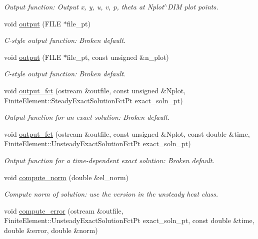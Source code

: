 \begin{DoxyCompactItemize}
\begin{DoxyCompactList}\small\item\em Output function\+: Output x, y, u, v, p, theta at Nplot$^\wedge$\+D\+IM plot points. \end{DoxyCompactList}\item 
void \hyperlink{classQThermalPVDElement_af290922dfcefef30dc03fca2a2cb4fbf}{output} (F\+I\+LE $\ast$file\+\_\+pt)
\begin{DoxyCompactList}\small\item\em C-\/style output function\+: Broken default. \end{DoxyCompactList}\item 
void \hyperlink{classQThermalPVDElement_a649062cd4f15d8f14a2755786dd466dc}{output} (F\+I\+LE $\ast$file\+\_\+pt, const unsigned \&n\+\_\+plot)
\begin{DoxyCompactList}\small\item\em C-\/style output function\+: Broken default. \end{DoxyCompactList}\item 
void \hyperlink{classQThermalPVDElement_accda081c3fb783b2c24715ec0c8e8e19}{output\+\_\+fct} (ostream \&outfile, const unsigned \&Nplot, Finite\+Element\+::\+Steady\+Exact\+Solution\+Fct\+Pt exact\+\_\+soln\+\_\+pt)
\begin{DoxyCompactList}\small\item\em Output function for an exact solution\+: Broken default. \end{DoxyCompactList}\item 
void \hyperlink{classQThermalPVDElement_a0bb6609214fc7991950848806f9fb742}{output\+\_\+fct} (ostream \&outfile, const unsigned \&Nplot, const double \&time, Finite\+Element\+::\+Unsteady\+Exact\+Solution\+Fct\+Pt exact\+\_\+soln\+\_\+pt)
\begin{DoxyCompactList}\small\item\em Output function for a time-\/dependent exact solution\+: Broken default. \end{DoxyCompactList}\item 
void \hyperlink{classQThermalPVDElement_a7824ab9fd50480c1eb8b20e57620afe5}{compute\+\_\+norm} (double \&el\+\_\+norm)
\begin{DoxyCompactList}\small\item\em Compute norm of solution\+: use the version in the unsteady heat class. \end{DoxyCompactList}\item 
void \hyperlink{classQThermalPVDElement_a64e5047e9a054544b61a6e8cf5534364}{compute\+\_\+error} (ostream \&outfile, Finite\+Element\+::\+Unsteady\+Exact\+Solution\+Fct\+Pt exact\+\_\+soln\+\_\+pt, const double \&time, double \&error, double \&norm)

\end{DoxyCompactItemize}
